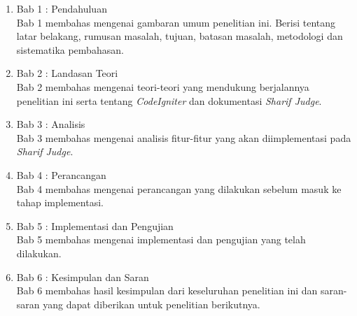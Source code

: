 \begin{enumerate}
	\item Bab 1 : Pendahuluan \\
	Bab 1 membahas mengenai gambaran umum penelitian ini. Berisi tentang latar belakang, rumusan masalah, tujuan, batasan masalah, metodologi dan sistematika pembahasan.
	
	\item Bab 2 : Landasan Teori \\
	Bab 2 membahas mengenai teori-teori yang mendukung berjalannya penelitian ini serta tentang \textit{CodeIgniter} dan dokumentasi \textit{Sharif Judge}.
	
	\item Bab 3 : Analisis \\
	Bab 3 membahas mengenai analisis fitur-fitur yang akan diimplementasi pada \textit{Sharif Judge}.
	
	\item Bab 4 : Perancangan \\
	Bab 4 membahas mengenai perancangan yang dilakukan sebelum masuk ke tahap implementasi.
	
	\item Bab 5 : Implementasi dan Pengujian \\
	Bab 5 membahas mengenai implementasi dan pengujian yang telah dilakukan.
	
	\item Bab 6 : Kesimpulan dan Saran \\
	Bab 6 membahas hasil kesimpulan dari keseluruhan penelitian ini dan saran-saran yang dapat diberikan untuk penelitian berikutnya.
\end{enumerate}